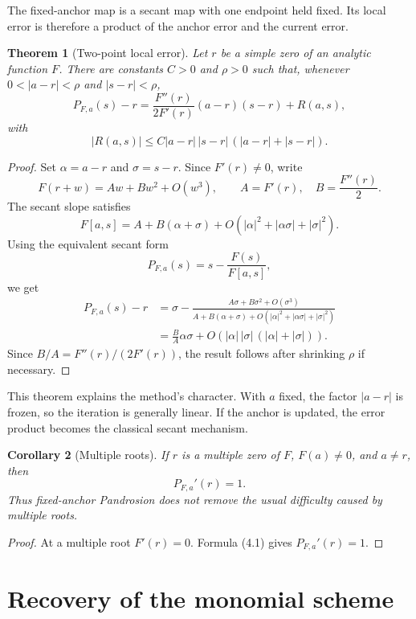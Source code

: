 \documentclass[11pt]{article}
\newtheorem{theorem}{Theorem}[section]
\newtheorem{corollary}[theorem]{Corollary}
\theoremstyle{definition}
\begin{document}
The fixed-anchor map is a secant map with one endpoint held fixed.  Its local error is therefore a product of the anchor error and the current error.

\begin{theorem}[Two-point local error]
Let $r$ be a simple zero of an analytic function $F$.  There are constants $C>0$ and $\rho>0$ such that, whenever
$0<|a-r|<\rho$ and $|s-r|<\rho$,
\[
        P_{F,a}(s)-r
        =\frac{F''(r)}{2F'(r)}(a-r)(s-r)
        +R(a,s),
        \tag{4.6}
\]
with
\[
        |R(a,s)|\le C|a-r|\,|s-r|\,(|a-r|+|s-r|).
        \tag{4.7}
\]
\end{theorem}

\begin{proof}
Set $\alpha=a-r$ and $\sigma=s-r$.  Since $F'(r)\ne0$, write
\[
        F(r+w)=A w+B w^2+O(w^3),
        \qquad A=F'(r),\quad B=\frac{F''(r)}{2}.
\]
The secant slope satisfies
\[
        F[a,s]=A+B(\alpha+\sigma)+O(|\alpha|^2+|\alpha\sigma|+|\sigma|^2).
\]
Using the equivalent secant form
\[
        P_{F,a}(s)=s-\frac{F(s)}{F[a,s]},
\]
we get
\[
\begin{aligned}
        P_{F,a}(s)-r
        &=\sigma-\frac{A\sigma+B\sigma^2+O(\sigma^3)}
        {A+B(\alpha+\sigma)+O(|\alpha|^2+|\alpha\sigma|+|\sigma|^2)}  \\
        &=\frac{B}{A}\alpha\sigma
          +O(|\alpha|\,|\sigma|\,(|\alpha|+|\sigma|)).
\end{aligned}
\]
Since $B/A=F''(r)/(2F'(r))$, the result follows after shrinking $\rho$ if necessary.
\end{proof}

This theorem explains the method's character.  With $a$ fixed, the factor $|a-r|$ is frozen, so the iteration is generally linear.  If the anchor is updated, the error product becomes the classical secant mechanism.

\begin{corollary}[Multiple roots]
If $r$ is a multiple zero of $F$, $F(a)\ne0$, and $a\ne r$, then
\[
        P_{F,a}'(r)=1.
\]
Thus fixed-anchor Pandrosion does not remove the usual difficulty caused by multiple roots.
\end{corollary}

\begin{proof}
At a multiple root $F'(r)=0$.  Formula (4.1) gives $P_{F,a}'(r)=1$.
\end{proof}

\section{Recovery of the monomial scheme}
\end{document}
